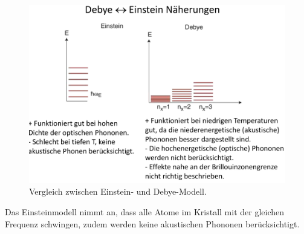 \label{q:30}

\begin{figure}[H]  
    \centering
    \includegraphics[width=.8\textwidth]{resources/09-05-2012/q30.png}
    \caption{Vergleich zwischen Einstein- und Debye-Modell.}
\end{figure}

Das Einsteinmodell nimmt an, dass alle Atome im Kristall mit der gleichen Frequenz schwingen, zudem werden keine akustischen Phononen berücksichtigt.

\newpage
